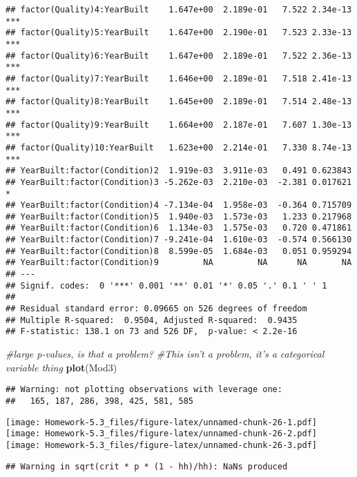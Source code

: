\documentclass[
]{article}
\newenvironment{Shaded}{\begin{snugshade}}{\end{snugshade}}
\newcommand{\CommentTok}[1]{\textcolor[rgb]{0.56,0.35,0.01}{\textit{#1}}}
\newcommand{\KeywordTok}[1]{\textcolor[rgb]{0.13,0.29,0.53}{\textbf{#1}}}
\newcommand{\NormalTok}[1]{#1}
\begin{document}
\begin{verbatim}
## factor(Quality)4:YearBuilt    1.647e+00  2.189e-01   7.522 2.34e-13 ***
## factor(Quality)5:YearBuilt    1.647e+00  2.190e-01   7.523 2.33e-13 ***
## factor(Quality)6:YearBuilt    1.647e+00  2.189e-01   7.522 2.36e-13 ***
## factor(Quality)7:YearBuilt    1.646e+00  2.189e-01   7.518 2.41e-13 ***
## factor(Quality)8:YearBuilt    1.645e+00  2.189e-01   7.514 2.48e-13 ***
## factor(Quality)9:YearBuilt    1.664e+00  2.187e-01   7.607 1.30e-13 ***
## factor(Quality)10:YearBuilt   1.623e+00  2.214e-01   7.330 8.74e-13 ***
## YearBuilt:factor(Condition)2  1.919e-03  3.911e-03   0.491 0.623843    
## YearBuilt:factor(Condition)3 -5.262e-03  2.210e-03  -2.381 0.017621 *  
## YearBuilt:factor(Condition)4 -7.134e-04  1.958e-03  -0.364 0.715709    
## YearBuilt:factor(Condition)5  1.940e-03  1.573e-03   1.233 0.217968    
## YearBuilt:factor(Condition)6  1.134e-03  1.575e-03   0.720 0.471861    
## YearBuilt:factor(Condition)7 -9.241e-04  1.610e-03  -0.574 0.566130    
## YearBuilt:factor(Condition)8  8.599e-05  1.684e-03   0.051 0.959294    
## YearBuilt:factor(Condition)9         NA         NA      NA       NA    
## ---
## Signif. codes:  0 '***' 0.001 '**' 0.01 '*' 0.05 '.' 0.1 ' ' 1
## 
## Residual standard error: 0.09665 on 526 degrees of freedom
## Multiple R-squared:  0.9504, Adjusted R-squared:  0.9435 
## F-statistic: 138.1 on 73 and 526 DF,  p-value: < 2.2e-16
\end{verbatim}

\begin{Shaded}
\begin{Highlighting}[]
\CommentTok{#large p-values, is that a problem?}
\CommentTok{#This isn't a problem, it's a categorical variable thing}
\KeywordTok{plot}\NormalTok{(Mod3)}
\end{Highlighting}
\end{Shaded}

\begin{verbatim}
## Warning: not plotting observations with leverage one:
##   165, 187, 286, 398, 425, 581, 585
\end{verbatim}

\texttt{[image: Homework-5.3\_files/figure-latex/unnamed-chunk-26-1.pdf]}
\texttt{[image: Homework-5.3\_files/figure-latex/unnamed-chunk-26-2.pdf]}
\texttt{[image: Homework-5.3\_files/figure-latex/unnamed-chunk-26-3.pdf]}

\begin{verbatim}
## Warning in sqrt(crit * p * (1 - hh)/hh): NaNs produced
\end{verbatim}
\end{document}
